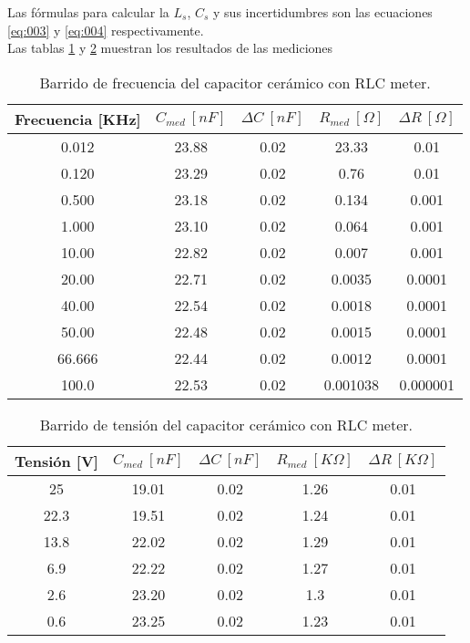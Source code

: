 \documentclass[a4paper,10pt]{article}
\begin{document}
		\indent Las fórmulas para calcular la $L_s$, $C_s$ y sus incertidumbres 
		son las ecuaciones \ref{eq:003} y \ref{eq:004} respectivamente. \\
		\indent Las tablas \ref{tab:006} y \ref{tab:007} muestran los resultados
		de las mediciones 
	
		\begin{table}[!htp]
			\centering
			\begin{tabular}{|c|c|c|c|c|}
				\hline
				Frecuencia [KHz] & $C_{med}~[nF]$ & $\Delta C~[nF]$ & 
				$R_{med}~[\Omega]$ & $\Delta R~[\Omega]$ \\
				\hline
				0.012 &	23.88 & 0.02 & 23.33 & 0.01 \\
				\hline
				0.120 &	23.29 & 0.02 & 0.76 & 0.01 \\
				\hline
				0.500 &	23.18 & 0.02 & 0.134 & 0.001 \\
				\hline
				1.000 &	23.10 & 0.02 & 0.064 & 0.001 \\
				\hline
				10.00 &	22.82 & 0.02 & 0.007 & 0.001 \\
				\hline
				20.00 &	22.71 & 0.02 & 0.0035 & 0.0001 \\
				\hline
				40.00 &	22.54 & 0.02 & 0.0018 & 0.0001 \\
				\hline
				50.00 &	22.48 & 0.02 & 0.0015 & 0.0001 \\
				\hline
				66.666 & 22.44 & 0.02 & 0.0012 & 0.0001 \\
				\hline
				100.0 &	22.53 & 0.02 & 0.001038 & 0.000001 \\
				\hline
			\end{tabular}
			\caption{Barrido de frecuencia del capacitor cerámico con RLC 
			meter.} 
			\label{tab:006}
		\end{table}	

		\begin{table}[!htp]
			\centering
			\begin{tabular}{|c|c|c|c|c|}
				\hline
				Tensión [V] & $C_{med}~[nF]$ & $\Delta C~[nF]$ & 
				$R_{med}~[K\Omega]$ & $\Delta R~[K\Omega]$\\
				\hline
				25 &	19.01 & 0.02 & 1.26 & 0.01 \\
				\hline
				22.3 &	19.51 & 0.02 & 1.24 & 0.01 \\
				\hline
				13.8 &	22.02 & 0.02 & 1.29 & 0.01 \\
				\hline
				6.9 &	22.22 & 0.02 & 1.27 & 0.01 \\
				\hline
				2.6 &	23.20 & 0.02 & 1.3 & 0.01 \\
				\hline
				0.6 &	23.25 & 0.02 & 1.23 & 0.01 \\
				\hline	  
			\end{tabular}
			\caption{Barrido de tensión del capacitor cerámico con RLC 
			meter.} 
			\label{tab:007}
		\end{table}	
		
\end{document}
